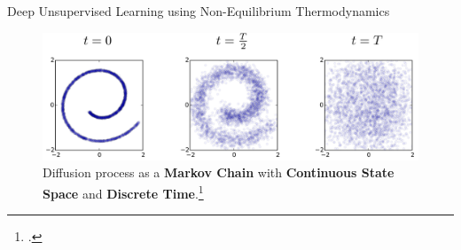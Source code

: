 \documentclass[aspectratio=169, 9pt]{beamer}
\theoremstyle{definition}
\begin{document}
\begin{frame}{Deep Unsupervised Learning using Non-Equilibrium Thermodynamics}
  \begin{figure}[h!]
    \centering
    \includegraphics[scale=.23]{./pic/thermodynimc.png}
    \caption{Diffusion process as a \textbf{Markov Chain} with \textbf{Continuous
    State Space} and \textbf{Discrete Time}.\footcite{thermodynamic}}
  \end{figure}
\end{frame}
\end{document}
